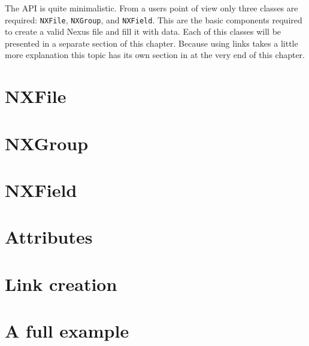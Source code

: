 
The API is quite minimalistic. From a users point of view only 
three classes are required: {\tt NXFile}, {\tt NXGroup}, and {\tt NXField}.
This are the basic components required to create a valid Nexus file and 
fill it with data. Each of this classes will be presented in a separate 
section of this chapter. 
Because using links takes a little more explanation this topic has 
its own section in at the very end of this chapter.

\section{NXFile}\label{section:nxfile}


\section{NXGroup}\label{section:nxgroup}


\section{NXField}\label{section:nxfield}


\section{Attributes}\label{section:attributes}

\section{Link creation}\label{section:links}

\section{A full example}\label{section:full_example}